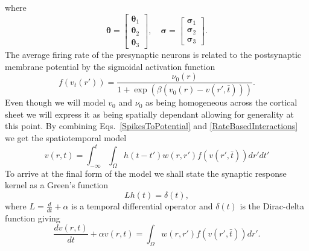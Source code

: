 \documentclass[onecolumn,draftcls]{IEEEtran}
\begin{document}
where
\begin{equation}
	\mathbf{\theta}=\begin{bmatrix} \mathbf{\theta}_{1}\\\mathbf{\theta}_{2}\\\mathbf \theta_{3}\end{bmatrix},\quad 		\mathbf{\sigma}=\begin{bmatrix}\mathbf{\sigma}_1\\\mathbf{\sigma}_2\\ \mathbf{\sigma}_3\end{bmatrix}.
\end{equation}
The average firing rate of the presynaptic neurons is related to the postsynaptic membrane potential by the sigmoidal activation function
\begin{equation}\label{ActivationFunction}
	f\left( v_t\left( r' \right) \right) = \frac{\nu _0\left(r\right)}{1 + \exp \left( \beta \left( v_0\left( r \right) - v\left(r',\bar{t} \right) \right) \right)}.
\end{equation}
Even though we will model $v_0$ and $\nu_0$ as being homogeneous across the cortical sheet we will express it as being spatially dependant allowing for generality at this point. By combining Eqs.~\ref{SpikesToPotential} and \ref{RateBasedInteractions} we get the spatiotemporal model
\begin{equation}\label{FullDoubleIntModel}
	v\left(r,t\right) = \int_{-\infty}^t \int_\Omega  h\left(t - t'\right) w\left(r,r'\right) f\left( v\left( r',\bar t \right)\right)dr'dt'
\end{equation}
To arrive at the final form of the model we shall state the synaptic response kernel as a Green's function
\begin{equation}\label{GreensFuncDef}
	Lh\left( t \right) = \delta \left( t \right),
\end{equation}
where $L=\frac{d}{dt} + \alpha$ is a temporal differential operator and $\delta(t)$ is the Dirac-delta function giving 
\begin{equation}\label{FinalForm1}
	\frac{dv\left( r,t \right)}{dt} + \alpha v\left( r,t \right) = \int_\Omega  {w\left( r,r' \right)f\left( {v\left( r',\bar t \right)} \right)dr'}.
\end{equation}
\end{document}
